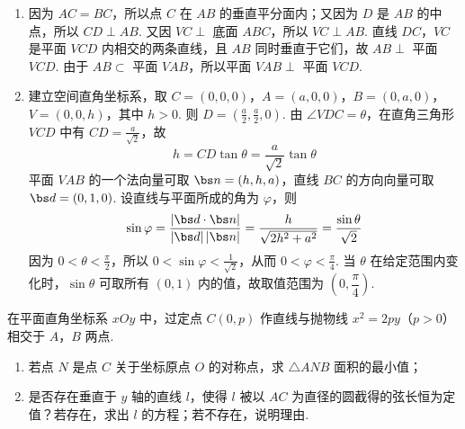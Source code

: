 \begin{solution}
\begin{enumerate}
\item 因为 \(AC=BC\)，所以点 \(C\) 在 \(AB\) 的垂直平分面内；又因为 \(D\) 是 \(AB\) 的中点，所以 \(CD\perp AB\). 又因 \(VC\perp\) 底面 \(ABC\)，所以 \(VC\perp AB\). 直线 \(DC\)，\(VC\) 是平面 \(VCD\) 内相交的两条直线，且 \(AB\) 同时垂直于它们，故 \(AB\perp\) 平面 \(VCD\). 由于 \(AB\subset\) 平面 \(VAB\)，所以平面 \(VAB\perp\) 平面 \(VCD\).
\item 建立空间直角坐标系，取 \(C=(0,0,0)\)，\(A=(a,0,0)\)，\(B=(0,a,0)\)，\(V=(0,0,h)\)，其中 \(h>0\). 则 \(D=(\frac{a}{2},\frac{a}{2},0)\). 由 \(\angle VDC=\theta\)，在直角三角形 \(VCD\) 中有 \(CD=\frac{a}{\sqrt2}\)，故
\[
h=CD\tan\theta=\frac{a}{\sqrt2}\tan\theta
\]
平面 \(VAB\) 的一个法向量可取 \(\bs n=(h,h,a)\)，直线 \(BC\) 的方向向量可取 \(\bs d=(0,1,0)\). 设直线与平面所成的角为 \(\varphi\)，则
\[
\sin\varphi=\frac{|\bs d\cdot\bs n|}{|\bs d|\,|\bs n|}=\frac{h}{\sqrt{2h^2+a^2}}=\frac{\sin\theta}{\sqrt2}
\]
因为 \(0<\theta<\frac{\pi}{2}\)，所以 \(0<\sin\varphi<\frac{1}{\sqrt2}\)，从而 \(0<\varphi<\frac{\pi}{4}\). 当 \(\theta\) 在给定范围内变化时，\(\sin\theta\) 可取所有 \((0,1)\) 内的值，故取值范围为 \(\left(0,\dfrac\pi4\right)\).
\end{enumerate}
\end{solution}

\begin{problem}
在平面直角坐标系 \(xOy\) 中，过定点 \(C(0,p)\) 作直线与抛物线 \(x^{2} = 2py\)（\(p > 0\)）相交于 \(A\)，\(B\) 两点.

\begin{enumerate}
\item 若点 \(N\) 是点 \(C\) 关于坐标原点 \(O\) 的对称点，求 \(\triangle ANB\) 面积的最小值；
\item 是否存在垂直于 \(y\) 轴的直线 \(l\)，使得 \(l\) 被以 \(AC\) 为直径的圆截得的弦长恒为定值？若存在，求出 \(l\) 的方程；若不存在，说明理由.
\end{enumerate}

\end{problem}

